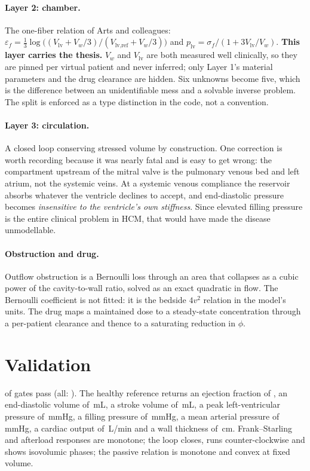 \documentclass[11pt,a4paper]{article}
\newcommand{\claim}[1]{\textcolor{accent}{\textbf{#1}}}
\begin{document}
\paragraph{Layer 2: chamber.} The one-fiber relation of Arts and colleagues:
$\varepsilon_f = \tfrac13\log\!\big((V_\text{lv}+V_w/3)/(V_\text{lv,ref}+V_w/3)\big)$ and
$p_\text{lv} = \sigma_f/(1+3V_\text{lv}/V_w)$. \claim{This layer carries the thesis.} $V_w$
and $V_\text{lv}$ are both measured well clinically, so they are pinned per virtual patient
and never inferred; only Layer 1's material parameters and the drug clearance are hidden.
Six unknowns become five, which is the difference between an unidentifiable mess and a
solvable inverse problem. The split is enforced as a type distinction in the code, not a
convention.

\paragraph{Layer 3: circulation.} A closed loop conserving stressed volume by construction.
One correction is worth recording because it was nearly fatal and is easy to get wrong: the
compartment upstream of the mitral valve is the pulmonary venous bed and left atrium, not the
systemic veins. At a systemic venous compliance the reservoir absorbs whatever the ventricle
declines to accept, and end-diastolic pressure becomes \emph{insensitive to the ventricle's
own stiffness}. Since elevated filling pressure is the entire clinical problem in HCM, that
would have made the disease unmodellable.

\paragraph{Obstruction and drug.} Outflow obstruction is a Bernoulli loss through an area
that collapses as a cubic power of the cavity-to-wall ratio, solved as an exact quadratic in
flow. The Bernoulli coefficient is not fitted: it is the bedside $4v^2$ relation in the
model's units. The drug maps a maintained dose to a steady-state concentration through a
per-patient clearance and thence to a saturating reduction in $\phi$.

\section{Validation}

\nGatesPassed{} of \nGates{} gates pass (all: \allGatesPass). The healthy reference returns an
ejection fraction of \healthyEF{}, an end-diastolic volume of \healthyEDV\,mL, a stroke volume
of \healthySV\,mL, a peak left-ventricular pressure of \healthyPeakLV\,mmHg, a filling pressure
of \healthyEDP\,mmHg, a mean arterial pressure of \healthyMAP\,mmHg, a cardiac output of
\healthyCO\,L/min and a wall thickness of \healthyWall\,cm. Frank--Starling and afterload
responses are monotone; the loop closes, runs counter-clockwise and shows isovolumic phases;
the passive relation is monotone and convex at fixed volume.
\end{document}
